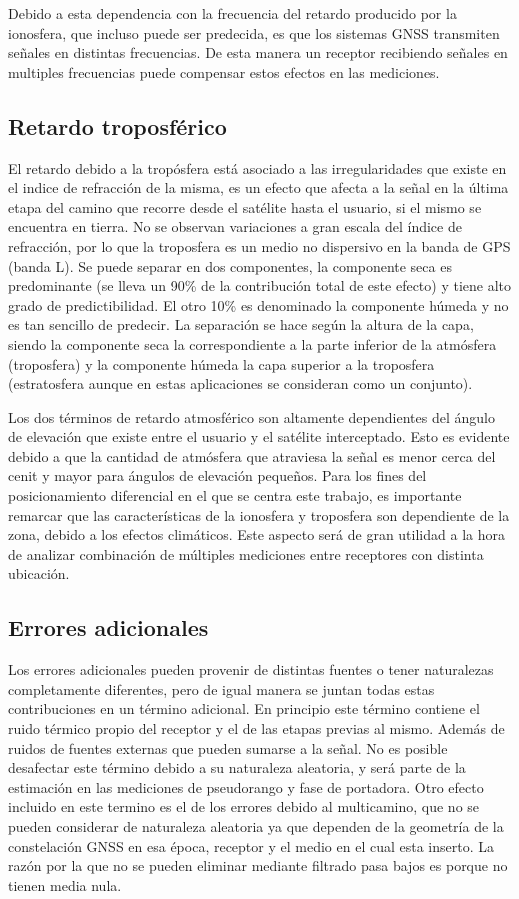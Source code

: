 \documentclass[a4paper,12pt,oneside,onecolumn,final,openright]{book}%
\begin{document}
	Debido a esta dependencia con la frecuencia del retardo producido por la ionosfera, que incluso puede ser predecida, es que los sistemas GNSS transmiten señales en distintas frecuencias. De esta manera un receptor recibiendo señales en multiples frecuencias puede compensar estos efectos en las mediciones.
	
	
\subsection*{Retardo troposférico}
	El retardo debido a la tropósfera está asociado a las irregularidades que existe en el indice de refracción de la misma, es un efecto que afecta a la señal en la última etapa del camino que recorre desde el satélite hasta el usuario, si el mismo se encuentra en tierra. No se observan variaciones a gran escala del índice de refracción, por lo que la troposfera es un medio no dispersivo en la banda de GPS (banda L). Se puede separar en dos componentes, la componente seca es predominante (se lleva un 90\% de la contribución total de este efecto) y tiene alto grado de predictibilidad. El otro 10\% es denominado la componente húmeda y no es tan sencillo de predecir. La separación se hace según la altura de la capa, siendo la componente seca la correspondiente a la parte inferior de la atmósfera (troposfera) y la componente húmeda la capa superior a la troposfera (estratosfera aunque en estas aplicaciones se consideran como un conjunto).

	Los dos términos de retardo atmosférico son altamente dependientes del ángulo de elevación que existe entre el usuario y el satélite interceptado. Esto es evidente debido a que la cantidad de atmósfera que atraviesa la señal es menor cerca del cenit y mayor para ángulos de elevación pequeños. Para los fines del posicionamiento diferencial en el que se centra este trabajo, es importante remarcar que las características de la ionosfera y troposfera son dependiente de la zona, debido a los efectos climáticos. Este aspecto será de gran utilidad a la hora de analizar combinación de múltiples mediciones entre receptores con distinta ubicación.
\subsection*{Errores adicionales}
	Los errores adicionales pueden provenir de distintas fuentes o tener naturalezas completamente diferentes, pero de igual manera se juntan todas estas contribuciones en un término adicional. En principio este término contiene el ruido térmico propio del receptor y el de las etapas previas al mismo. Además de ruidos de fuentes externas que pueden sumarse a la señal. No es posible desafectar este término debido a su naturaleza aleatoria, y será parte de la estimación en las mediciones de pseudorango y fase de portadora. Otro efecto incluido en este termino es el de los errores debido al multicamino, que no se pueden considerar de naturaleza aleatoria ya que dependen de la geometría de la constelación GNSS en esa época, receptor y el medio en el cual esta inserto. La razón por la que no se pueden eliminar mediante filtrado pasa bajos es porque no tienen media nula. 
	
\end{document}
